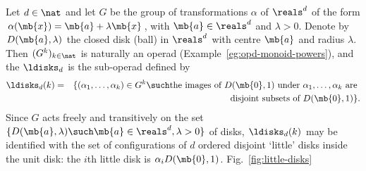 \begin{example}	
Let $d\in\nat$ and let $G$ be the group of transformations $\alpha$ of
$\reals^d$ of the form $\alpha(\mb{x}) = \mb{a} + \lambda \mb{x}$, with
$\mb{a} \in \reals^d$ and $\lambda > 0$.  Denote by $D(\mb{a}, \lambda)$
the closed disk
(ball) in $\reals^d$ with centre $\mb{a}$ and radius
$\lambda$.  Then $(G^k)_{k\in\nat}$ is naturally an operad
(Example~\ref{eg:opd-monoid-powers}), and the  $\ldisks_d$%
% 
% 
is the sub-operad defined by
%
\begin{eqnarray*}
\ldisks_d(k)	&
=	&
\{ (\alpha_1, \ldots, \alpha_k) \in G^k \such	
\textrm{the images of } D(\mb{0}, 1) \textrm{ under }
\alpha_1, \ldots, \alpha_k \textrm{ are }
\\&&
\textrm{disjoint subsets of }
D(\mb{0}, 1) \}.
\end{eqnarray*}
%
Since $G$ acts freely and transitively on the set $\{D(\mb{a}, \lambda)
\such \mb{a} \in \reals^d, \lambda>0 \}$ of disks, $\ldisks_d(k)$ may be
identified with the set of configurations of $d$ ordered disjoint `little'
disks inside the unit disk: the $i$th little disk is $\alpha_i D(\mb{0},
1)$.  Fig.~\ref{fig:little-disks}
%
\end{example}
